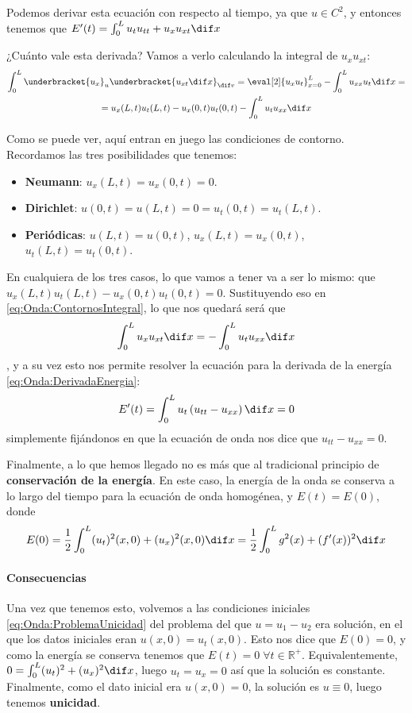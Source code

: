 		Podemos derivar esta ecuación con respecto al tiempo, ya que $u ∈ C^2$, y entonces tenemos que  \( E'(t) = \int_{0}^L u_t u_{tt} + u_x u_{xt} \dif x \label{eq:Onda:DerivadaEnergia} \)

		¿Cuánto vale esta derivada? Vamos a verlo calculando la integral de $u_x u_{xt}$:
		\begin{multline}
		\int_0^L \underbracket{u_x}_u \underbracket{u_{xt} \dif x}_{\dif v} = \eval[2]{u_x u_t}_{x= 0}^L - \int_0^L u_{xx} u_t \dif x = \\
		= u_x(L,t) u_t(L, t) - u_x(0,t) u_t(0,t) - \int_0^L u_t u_{xx} \dif x \label{eq:Onda:ContornosIntegral}
		\end{multline}

		Como se puede ver, aquí entran en juego las condiciones de contorno. Recordamos las tres posibilidades que tenemos:

		\begin{itemize}[itemsep = 0pt]
		\item \textbf{Neumann}: $u_x(L, t) = u_x(0,t) = 0$.
		\item \textbf{Dirichlet}: $u(0,t) = u(L, t) = 0 = u_t(0,t) = u_t(L, t)$.
		\item \textbf{Periódicas}: $u(L, t) = u(0,t)$, $u_x(L, t) = u_x(0,t)$, $u_t(L, t) = u_t(0,t)$.
		\end{itemize}

		En cualquiera de los tres casos, lo que vamos a tener va a ser lo mismo: que $u_x(L,t) u_t(L, t) - u_x(0,t) u_t(0,t) = 0$. Sustituyendo eso en \eqref{eq:Onda:ContornosIntegral}, lo que nos quedará será que \[ \int_0^L u_x u_{xt} \dif x = - \int_{0}^L u_t u_{xx} \dif x \], y a su vez esto nos permite resolver la ecuación para la derivada de la energía \eqref{eq:Onda:DerivadaEnergia}:
		\[ E'(t) = \int_0^L u_t \left(u_{tt} - u_{xx} \right) \dif x = 0\]
		simplemente fijándonos en que la ecuación de onda nos dice que $u_{tt} - u_{xx} = 0$.

		Finalmente, a lo que hemos llegado no es más que al tradicional principio de \textbf{conservación de la energía}. En este caso, la energía de la onda se conserva a lo largo del tiempo para la ecuación de onda homogénea, y $E(t) = E(0)$, donde
		\[ E(0) = \frac{1}{2} \int_0^L (u_t)^2 (x,0) + (u_x)^2 (x,0) \dif x = \frac{1}{2} \int_0^L g^2(x)+(f'(x))^2 \dif x \]

		\paragraph{Consecuencias} Una vez que tenemos esto, volvemos a las condiciones iniciales \eqref{eq:Onda:ProblemaUnicidad} del problema del que $u = u_1 - u_2$ era solución, en el que los datos iniciales eran $u(x,0) = u_t(x,0)$. Esto nos dice que $E(0) = 0$, y como la energía se conserva tenemos que $E(t) = 0\;∀t ∈ ℝ^+$. Equivalentemente, $0 = \int_0^L (u_t)^2 + (u_x)^2 \dif x$, luego $u_t = u_x = 0$ así que la solución es constante. Finalmente, como el dato inicial era $u(x,0) = 0$, la solución es $u \equiv 0$, luego tenemos \textbf{unicidad}.


